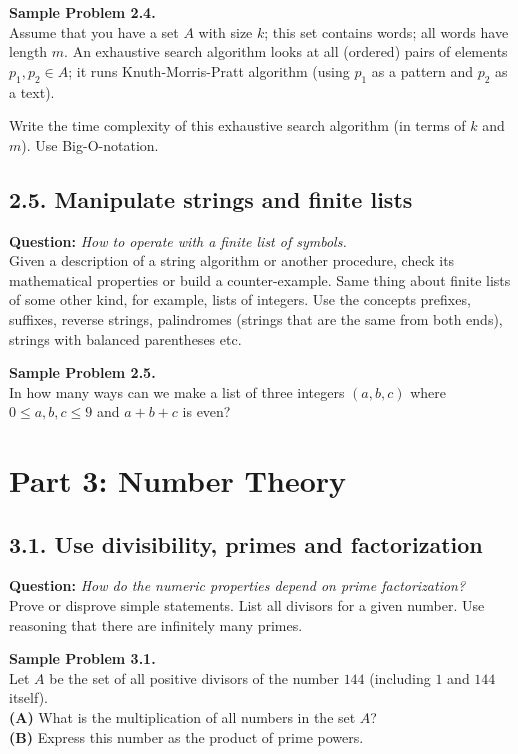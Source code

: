 \documentclass[jou]{apa6}
\begin{document}
\vspace{6pt}
{\bf Sample Problem 2.4.}\\
Assume that you have a set $A$ with size $k$; this set contains 
words; all words have length $m$. An exhaustive search algorithm 
looks at all (ordered) pairs of elements $p_1,p_2 \in A$; 
it runs Knuth-Morris-Pratt algorithm (using $p_1$ as a pattern
and $p_2$ as a text). 

Write the time complexity of this exhaustive search algorithm 
(in terms of $k$ and $m$). Use Big-O-notation.


\subsection{2.5. Manipulate strings and finite lists}

{\bf Question:} {\em How to operate with a finite list of symbols.}\\
{\scriptsize 
Given a description of a string algorithm or another procedure, 
check its mathematical properties or build a counter-example. 
Same thing about finite lists of some other kind, for example, lists of integers. 
Use the concepts prefixes, suffixes, reverse strings, palindromes 
(strings that are the same from both ends), strings with balanced parentheses etc.
}

\vspace{6pt}
{\bf Sample Problem 2.5.}\\
In how many ways  can we make a list of three integers $(a,b,c)$ where 
$0 \leq a,b,c \leq 9$ and $a+b+c$ is even?


\newpage
\section{Part 3: Number Theory}

\subsection{3.1. Use divisibility, primes and factorization}

{\bf Question:} {\em How do the numeric properties depend on prime factorization?}\\
{\scriptsize 
Prove or disprove simple statements. List all divisors for a given number. 
Use reasoning that there are infinitely many primes.
}

\vspace{6pt}
{\bf Sample Problem 3.1.}\\
Let $A$ be the set of all positive divisors of the number $144$ 
(including $1$ and $144$ itself).\\
{\bf (A)} What is the multiplication of all 
numbers in the set $A$?\\
{\bf (B)} Express this number as the product of prime powers.
\end{document}
